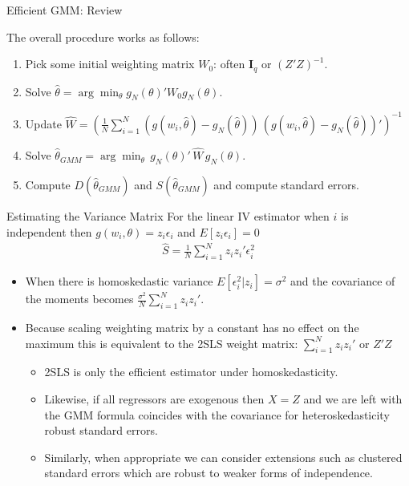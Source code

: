 \documentclass[aspectratio=169]{beamer}
\begin{document}
\begin{frame}{Efficient GMM: Review}

\noindent The overall procedure works as follows:
\begin{enumerate}
\item Pick some initial weighting matrix $W_0$: often $\mathbf{I}_q$ or $(Z'Z)^{-1}$.
\item Solve $\hat{\theta} = \arg \min_{\theta} g_N(\theta)' W_0  g_N(\theta)$.
\item Update $\hat{W} = \left(\frac{1}{N} \sum_{i=1}^N (g(w_i,\hat{\theta}) - g_N(\hat{\theta}))  \, (g(w_i,\hat{\theta}) - g_N(\hat{\theta}))'\right)^{-1}$
\item Solve $\hat{\theta}_{GMM} = \arg \min_{\theta}\, g_N(\theta)' \, \hat{W} \, g_N(\theta)$.
\item Compute $D(\hat{\theta}_{GMM})$ and $S(\hat{\theta}_{GMM})$ and compute standard errors.
\end{enumerate}
\end{frame}

\begin{frame}{Estimating the Variance Matrix}
For the linear IV estimator when $i$ is independent then $g(w_i,\theta) = z_i \epsilon_i$ and $E[z_i \epsilon_i]=0$
\begin{eqnarray*}
\hat{S}=\frac{1}{N} \sum_{i=1}^N z_i z_i' \epsilon_i^2
\end{eqnarray*}
\begin{itemize}
\item When there is homoskedastic variance $E[\epsilon_i^2 | z_i] = \sigma^2$ and the covariance of the moments becomes $\frac{\sigma^2}{N} \sum_{i=1}^N z_i z_i'$.
\item Because scaling weighting matrix by a constant has no effect on the maximum this is equivalent to the 2SLS weight matrix: $\sum_{i=1}^N z_i z_i'$ or $Z'Z$
\begin{itemize}
\item  2SLS is only the efficient estimator under \alert{homoskedasticity}.
\item  Likewise, if all regressors are exogenous then $X=Z$ and we are left with the GMM formula coincides with the covariance for heteroskedasticity robust standard errors.
\item Similarly, when appropriate we can consider extensions such as \alert{clustered standard errors} which are robust to weaker forms of independence.
\end{itemize}
\end{itemize}
\end{frame}
\end{document}
